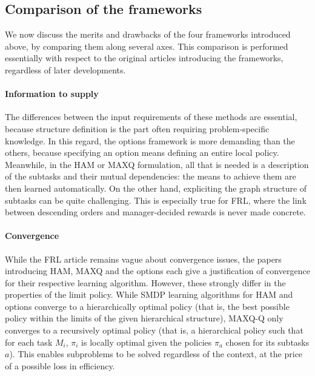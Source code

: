 \documentclass{article}
\begin{document}
\subsection{Comparison of the frameworks}

We now discuss the merits and drawbacks of the four frameworks introduced above, by comparing them along several axes. This comparison is performed essentially with respect to the original articles introducing the frameworks, regardless of later developments.

\paragraph{Information to supply} The differences between the input requirements of these methods are essential, because structure definition is the part often requiring problem-specific knowledge. In this regard, the options framework is more demanding than the others, because specifying an option means defining an entire local policy. Meanwhile, in the HAM or MAXQ formulation, all that is needed is a description of the subtasks and their mutual dependencies: the means to achieve them are then learned automatically. On the other hand, expliciting the graph structure of subtasks can be quite challenging. This is especially true for FRL, where the link between descending orders and manager-decided rewards is never made concrete.

\paragraph{Convergence} While the FRL article remains vague about convergence issues, the papers introducing HAM, MAXQ and the options each give a justification of convergence for their respective learning algorithm. However, these strongly differ in the properties of the limit policy. While SMDP learning algorithms for HAM and options converge to a hierarchically optimal policy (that is, the best possible policy within the limits of the given hierarchical structure), MAXQ-Q only converges to a recursively optimal policy (that is, a hierarchical policy such that for each task $M_i$, $\pi_i$ is locally optimal given the policies $\pi_a$ chosen for its subtasks $a$). This enables subproblems to be solved regardless of the context, at the price of a possible loss in efficiency.
\end{document}
